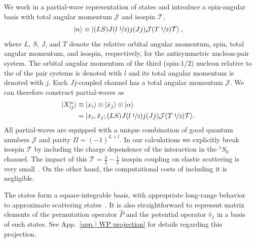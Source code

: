 \documentclass[aps,prc,showpacs,twocolumn,floatfix,nobibnotes,nofootinbib,amsmath,amssymb,longbibliography]{revtex4-2}
\begin{document}
We work in a partial-wave representation of \NNN{} states and
introduce a spin-angular basis with total angular momentum $\mathcal{J}$ and isospin $\mathcal{T}$,
\begin{equation}
  | \alpha \rangle \equiv | (LS)J (l\:\nicefrac{1}{2})j(Jj)\mathcal{J}(T\:\nicefrac{1}{2})\mathcal{T}\rangle\:,
\end{equation}
where $L$, $S$, $J$, and $T$ denote the relative orbital angular
momentum, spin, total angular momentum, and isospin, respectively, for
the antisymmetric nucleon-pair system. The orbital angular momentum of the third
(spin-$1/2$) nucleon relative to the \cm{} of the
pair systems is denoted with $l$ and its total angular momentum is
denoted with $j$. Each $Jj$-coupled channel has a total angular
momentum $\mathcal{J}$. We can therefore construct \NNN{}
partial-waves as
\begin{align}
	\begin{split}
	|X_{ij}^{\alpha}\rangle &\equiv |x_i\rangle \otimes |\bar{x}_j\rangle \otimes |\alpha\rangle\\
	&= |x_i,\bar{x}_j;(LS)J(l\:\nicefrac{1}{2})j(Jj)\mathcal{J}(T\:\nicefrac{1}{2})\mathcal{T}\rangle.
	\end{split}
\end{align}
All \NNN{} partial-waves are equipped with a unique combination of good
quantum numbers $\mathcal{J}$ and parity $\Pi = (-1)^{L+l}$. In our
calculations we explicitly break isospin $\mathcal{T}$ by including
the charge dependence of the \NN{} interaction in the $^1S_0$
channel. The impact of this $\mathcal{T}=\frac{3}{2} - \frac{1}{2}$
isospin coupling on elastic \Nd{} scattering is very small~\cite
{Witala:2016inj}. On the other hand, the computational costs of
including it is negligible.

The \fwp{} states form a square-integrable basis, with appropriate
long-range behavior to approximate scattering
states~\cite{Pomerantsev:2008tw}. It is also straightforward to
represent matrix elements of the permutation operator $\hat{P}$ and
the \NN{} potential operator $\hat{v}_1$ in a basis of such
states. See App.~\ref{app | WP projection} for details regarding this
projection.
\end{document}
